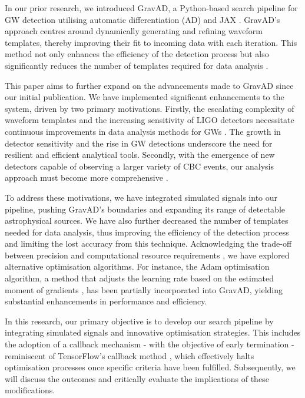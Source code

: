 \documentclass[twocolumn, aps, pra]{revtex4-2}
\begin{document}
	In our prior research, we introduced GravAD, a Python-based search pipeline for GW detection utilising automatic differentiation (AD) and JAX \cite{jax2018github}. GravAD's approach centres around dynamically generating and refining waveform templates, thereby improving their fit to incoming data with each iteration. This method not only enhances the efficiency of the detection process but also significantly reduces the number of templates required for data analysis \cite{Doyle_2023}.
	
	This paper aims to further expand on the advancements made to GravAD since our initial publication. We have implemented significant enhancements to the system, driven by two primary motivations. Firstly, the escalating complexity of waveform templates and the increasing sensitivity of LIGO detectors necessitate continuous improvements in data analysis methods for GWs \cite{tedwards, abbott_2020}. The growth in detector sensitivity and the rise in GW detections underscore the need for resilient and efficient analytical tools. Secondly, with the emergence of new detectors capable of observing a larger variety of CBC events, our analysis approach must become more comprehensive \cite{menge_2020}.
	
	To address these motivations, we have integrated simulated signals into our pipeline, pushing GravAD's boundaries and expanding its range of detectable astrophysical sources. We have also further decreased the number of templates needed for data analysis, thus improving the efficiency of the detection process and limiting the lost accuracy from this technique. Acknowledging the trade-off between precision and computational resource requirements \cite{Coogan_2022}, we have explored alternative optimisation algorithms. For instance, the Adam optimisation algorithm, a method that adjusts the learning rate based on the estimated moment of gradients \cite{adam}, has been partially incorporated into GravAD, yielding substantial enhancements in performance and efficiency.
	
	In this research, our primary objective is to develop our search pipeline by integrating simulated signals and innovative optimisation strategies. This includes the adoption of a callback mechanism - with the objective of early termination - reminiscent of TensorFlow's callback method \cite{tf}, which effectively halts optimisation processes once specific criteria have been fulfilled. Subsequently, we will discuss the outcomes and critically evaluate the implications of these modifications.
	
\end{document}
